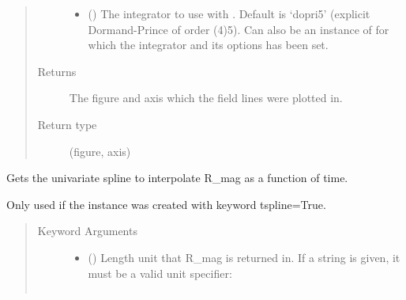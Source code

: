 \documentclass[letterpaper,10pt,english]{sphinxmanual}
\begin{document}
\begin{fulllineitems}
\begin{fulllineitems}
\begin{quote}
\begin{description}
\begin{itemize}
\item {} 
 () \textendash{} The integrator to use with
. Default is ‘dopri5’ (explicit
Dormand-Prince of order (4)5). Can also be an instance of
 for which the integrator and its
options has been set.

\end{itemize}

\item[{Returns}] \leavevmode
The figure and axis which the field lines were plotted in.

\item[{Return type}] \leavevmode
(figure, axis)

\end{description}\end{quote}

\end{fulllineitems}


\begin{fulllineitems}
\label{\detokenize{eqtools:eqtools.core.Equilibrium.getMagRSpline}}
Gets the univariate spline to interpolate R\_mag as a function of time.

Only used if the instance was created with keyword tspline=True.
\begin{quote}\begin{description}
\item[{Keyword Arguments}] \leavevmode\begin{itemize}
\item {} 
 () \textendash{} 
Length unit that R\_mag is returned in. If
a string is given, it must be a valid unit specifier:
\begin{quote}


\begin{savenotes}\sphinxattablestart
\centering
\begin{tabulary}{\linewidth}[t]{|T|T|}
\hline


\end{tabulary}
\end{savenotes}
\end{quote}
\end{itemize}
\end{description}
\end{quote}
\end{fulllineitems}
\end{fulllineitems}
\end{document}
